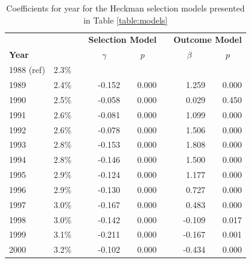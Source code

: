 \begin{table}[H]
	\renewcommand{\baselinestretch}{1.1} 
	\small
	\centering
	\caption{{Coefficients for year for the Heckman selection models presented in Table \ref{table:models}}}
	\label{table:models_2}
	\begin{tabular}{lrrrrrrr}
		\hline
		&         &  & \multicolumn{2}{r}{\textbf{Selection Model}}              &                      & \multicolumn{2}{r}{\textbf{Outcome Model}}                \\
		\textbf{Year}   &  &  & \multicolumn{1}{c}{$\gamma$} & \multicolumn{1}{c}{$p$} & \multicolumn{1}{c}{} & \multicolumn{1}{c}{$\beta$} & \multicolumn{1}{c}{$p$} \\ \hline
		
		1988 (ref) & 2.3\% &  &                   &                 &  &                  &                \\
		1989       & 2.4\% &  & -0.152            & 0.000           &  & 1.259            & 0.000          \\
		1990       & 2.5\% &  & -0.058            & 0.000           &  & 0.029            & 0.450          \\
		1991       & 2.6\% &  & -0.081            & 0.000           &  & 1.099            & 0.000          \\
		1992       & 2.6\% &  & -0.078            & 0.000           &  & 1.506            & 0.000          \\
		1993       & 2.8\% &  & -0.153            & 0.000           &  & 1.808            & 0.000          \\
		1994       & 2.8\% &  & -0.146            & 0.000           &  & 1.500            & 0.000          \\
		1995       & 2.9\% &  & -0.124            & 0.000           &  & 1.177            & 0.000          \\
		1996       & 2.9\% &  & -0.130            & 0.000           &  & 0.727            & 0.000          \\
		1997       & 3.0\% &  & -0.167            & 0.000           &  & 0.483            & 0.000          \\
		1998       & 3.0\% &  & -0.142            & 0.000           &  & -0.109           & 0.017          \\
		1999       & 3.1\% &  & -0.211            & 0.000           &  & -0.167           & 0.001          \\
		2000       & 3.2\% &  & -0.102            & 0.000           &  & -0.434           & 0.000          \\

\end{tabular}
\end{table}
